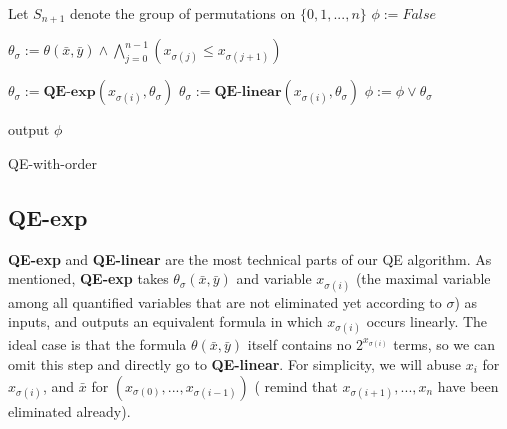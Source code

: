 \documentclass[runningheads]{llncs}
\newcommand\znj[1]{\textcolor{red}{#1}}
\begin{document}
\begin{algorithm}[t]
    \SetAlgoLined
    
    Let $S_{n+1}$ denote the group of permutations on $\{0,1,...,n\}$\;
    $\phi :=  \textit{False}$\;
    {
        $\theta_{\sigma}:=  \theta(\bar{x},\bar{y})\wedge \bigwedge_{j=0}^{n-1}(x_{\sigma(j)}\le x_{\sigma(j+1)})$\;
        
        {
            $\theta_{\sigma}:= \textbf{QE-exp}(x_{\sigma(i)},\theta_{\sigma})$\;
            $\theta_{\sigma}:= \textbf{QE-linear}(x_{\sigma(i)},\theta_{\sigma})$\;
        }
        $\phi :=  \phi \vee \theta_{\sigma}$\;
    }
\iffalse
    \For{i from $0$ to $n$}
    {
        \tcp{ specify the maximal quantified variable}
        $\theta_i :=  \theta(\bar{x},\bar{y}) \wedge (\bigwedge_{0\le j \le n} x_i - x_j \ge 0)$\;
        \tcp{ eliminate $x_i$}
        \While{$x_i$ occurs in an exponential term in formula $\tau(x_i,\bar{x},\bar{y})$}{
            \tcp{ QE-exp outputs a formula equivalent with $\tau(x_i,\bar{x},\bar{y})$ where $x_i$ occurs linearly }
            $\theta_i :=  \theta_i[\text{QE-exp}(\tau(x_i,\bar{x},\bar{y}))/\tau(x_i,\bar{x},\bar{y})]$\;
        }   
        transform $\theta_i$ into disjunction normal form $\theta_i = \bigvee_s \theta_{i,s}$\;
        \For{ every $\theta_{i,s}$ }{
            $\theta'_{i,s} :=  \text{QE-linear}(x_i,\theta_{i,s})$
        }
        $\theta'_i =\bigvee_s \theta'_{i,s}$\;
    }
\fi
    output $\phi$
    \caption{QE-with-order}
\end{algorithm}


\subsection{QE-exp}

\textbf{QE-exp} and \textbf{QE-linear} are the most technical parts of our QE algorithm.
As mentioned, 
\textbf{QE-exp} takes $\theta_{\sigma}(\bar{x},\bar{y})$ and  variable $x_{\sigma(i)}$ (the maximal variable among all quantified variables that are not eliminated yet according to $\sigma$) as 
inputs, and  outputs an equivalent formula in which $x_{\sigma(i)}$ occurs linearly.
The ideal case is that the formula $\theta(\bar{x},\bar{y})$ itself contains no $2^{x_{\sigma(i)}}$ terms, so we can omit this step and directly go to \textbf{QE-linear}.
For simplicity, we will abuse   $x_i$ for $x_{\sigma(i)}$, 
and  $\bar{x}$ for $(x_{\sigma(0)},...,x_{\sigma(i-1)})$ ( remind that $x_{\sigma(i+1)},...,x_n$ have been eliminated already).
\end{document}
